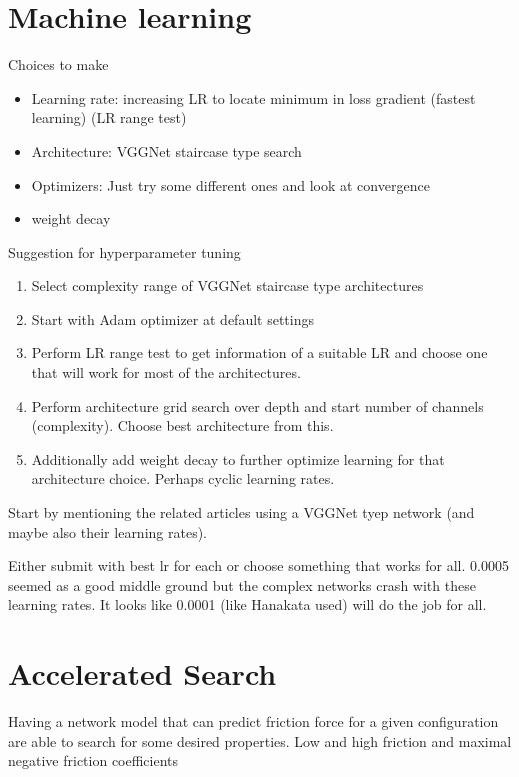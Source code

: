 \section{Machine learning}

Choices to make
\begin{itemize}
  \item Learning rate: increasing LR to locate minimum in loss gradient (fastest learning) (LR range test) %
  \item Architecture: VGGNet staircase type search
  \item Optimizers: Just try some different ones and look at convergence
  \item weight decay
\end{itemize}

Suggestion for hyperparameter tuning 
\begin{enumerate}
  \item Select complexity range of VGGNet staircase type architectures
  \item Start with Adam optimizer at default settings
  \item Perform LR range test to get information of a suitable LR and choose one that will work for most of the architectures. 
  \item Perform architecture grid search over depth and start number of channels (complexity). Choose best architecture from this. 
  \item Additionally add weight decay to further optimize learning for that architecture choice. Perhaps cyclic learning rates. 
\end{enumerate}

Start by mentioning the related articles using a VGGNet tyep network (and maybe also their learning rates). 

 
Either submit with best lr for each or choose something that works for all. 0.0005 seemed as a good middle ground but the complex networks crash with these learning rates. It looks like 0.0001 (like Hanakata used) will do the job for all. 

\section{Accelerated Search}

Having a network model that can predict friction force for a given configuration are able to search for some desired properties. Low and high friction and maximal negative friction coefficients


